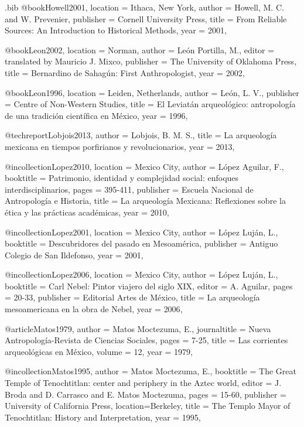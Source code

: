 \begin{filecontents}{\IJSRAidentifier.bib}
@book{Howell2001,
location =  {Ithaca, New York},
author = {Howell, M. C. and W. Prevenier},
publisher = {Cornell University Press},
title = {From Reliable Sources: An Introduction to Historical Methods},
year = {2001},
}


@book{Leon2002,
location =  {Norman},
author = {León Portilla, M.},
editor = {translated by Mauricio J. Mixco},
publisher = {The University of Oklahoma Press},
title = {Bernardino de Sahagún: First Anthropologist},
year = {2002},
}


@book{Leon1996,
location =  {Leiden, Netherlands},
author = {León, L. V.},
publisher = {Centre of Non-Western Studies},
title = {El Leviatán arqueológico: antropología de una tradición científica en México},
year = {1996},
}


@techreport{Lobjois2013,
author = {Lobjois, B. M. S.},
title = {La arqueología mexicana en tiempos porfirianos y revolucionarios},
year = {2013},
}


@incollection{Lopez2010,
location =  {Mexico City},
author = {López Aguilar, F.},
booktitle = {Patrimonio, identidad y complejidad social: enfoques interdisciplinarios},
pages = {395-411},
publisher = {Escuela Nacional de Antropología e Historia},
title = {La arqueología Mexicana: Reflexiones sobre la ética y las prácticas académicas},
year = {2010},
}


@incollection{Lopez2001,
location = {Mexico City},
author = {López Luján, L.},
booktitle = {Descubridores del pasado en Mesoamérica},
publisher = {Antiguo Colegio de San Ildefonso},
year = {2001},
}


@incollection{Lopez2006,
location =  {Mexico City},
author = {López Luján, L.},
booktitle = {Carl Nebel: Pintor viajero del siglo XIX},
editor = {A. Aguilar},
pages = {20-33},
publisher = {Editorial Artes de México},
title = {La arqueología mesoamericana en la obra de Nebel},
year = {2006},
}


@article{Matos1979,
author = {Matos Moctezuma, E.},
journaltitle =  {Nueva Antropología-Revista de Ciencias Sociales},
pages = {7-25},
title = {Las corrientes arqueológicas en México},
volume = {12},
year = {1979},
}


@incollection{Matos1995,
author = {Matos Moctezuma, E.},
booktitle = {The Great Temple of Tenochtitlan: center and periphery in the Aztec world},
editor = {J. Broda and D. Carrasco and E. Matos Moctezuma},
pages = {15-60},
publisher = {University of California Press},
location={Berkeley},
title = {The Templo Mayor of Tenochtitlan: History and Interpretation},
year = {1995},
}



\end{filecontents}
